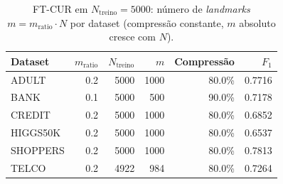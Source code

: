 \begin{table}[ht]
  \centering
  \caption[\textit{Landmarks} do FT-CUR em $N_{\text{treino}}=5000$]{FT-CUR em $N_{\text{treino}}=5000$: número de \textit{landmarks} $m = m_{\text{ratio}} \cdot N$ por dataset (compressão constante, $m$ absoluto cresce com $N$).}
  \label{tab:tier2_n5000_ftcur_m}
  \begin{tabular}{lrrrrr}
    \toprule
    Dataset & $m_{\text{ratio}}$ & $N_{\text{treino}}$ & $m$ & Compressão & $F_1$ \\
    \midrule
    ADULT & 0.2 & 5000 & 1000 & 80.0\% & 0.7716 \\
    BANK & 0.1 & 5000 & 500 & 90.0\% & 0.7178 \\
    CREDIT & 0.2 & 5000 & 1000 & 80.0\% & 0.6852 \\
    HIGGS50K & 0.2 & 5000 & 1000 & 80.0\% & 0.6537 \\
    SHOPPERS & 0.2 & 5000 & 1000 & 80.0\% & 0.7813 \\
    TELCO & 0.2 & 4922 & 984 & 80.0\% & 0.7264 \\
    \bottomrule
  \end{tabular}
\end{table}
